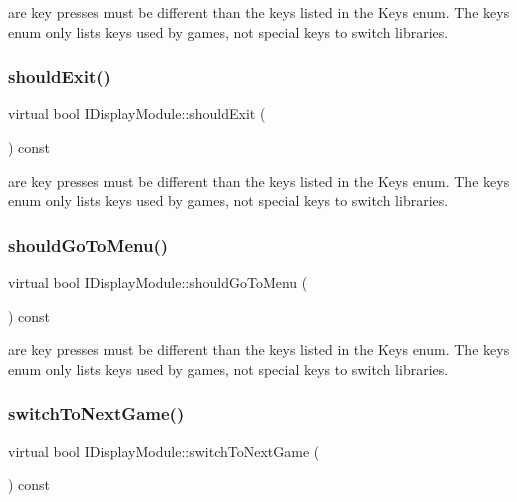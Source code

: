 are key presses must be different than the keys listed in the Keys enum. The keys enum only lists keys used by games, not special keys to switch libraries. \mbox{\label{class_i_display_module_a9ed6fcb0e0aaccc0da0617f96fe46582}} 
\subsubsection{\texorpdfstring{should\+Exit()}{shouldExit()}}
{\footnotesize\ttfamily virtual bool I\+Display\+Module\+::should\+Exit (\begin{DoxyParamCaption}{ }\end{DoxyParamCaption}) const\hspace{0.3cm}{\ttfamily [pure virtual]}}

are key presses must be different than the keys listed in the Keys enum. The keys enum only lists keys used by games, not special keys to switch libraries. \mbox{\label{class_i_display_module_a305f8c4085dd4555c210f09e625395a8}} 
\subsubsection{\texorpdfstring{should\+Go\+To\+Menu()}{shouldGoToMenu()}}
{\footnotesize\ttfamily virtual bool I\+Display\+Module\+::should\+Go\+To\+Menu (\begin{DoxyParamCaption}{ }\end{DoxyParamCaption}) const\hspace{0.3cm}{\ttfamily [pure virtual]}}

are key presses must be different than the keys listed in the Keys enum. The keys enum only lists keys used by games, not special keys to switch libraries. \mbox{\label{class_i_display_module_a7b6a45861835b29679c6c5799b63c4f1}} 
\subsubsection{\texorpdfstring{switch\+To\+Next\+Game()}{switchToNextGame()}}
{\footnotesize\ttfamily virtual bool I\+Display\+Module\+::switch\+To\+Next\+Game (\begin{DoxyParamCaption}{ }\end{DoxyParamCaption}) const\hspace{0.3cm}{\ttfamily [pure virtual]}}


